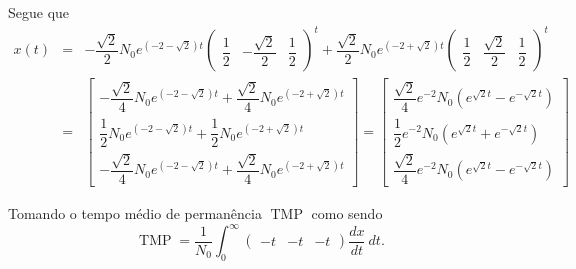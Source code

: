 Segue que
\[\begin{array}{rclcl}
x(t) &=& - \dfrac{\sqrt{2}}{2}N_{0} e^{(-2 - \sqrt{2})t} \left(\begin{array}{ccc} \dfrac{1}{2} & - \dfrac{\sqrt{2}}{2} & \dfrac{1}{2} \end{array}\right)^{t} + \dfrac{\sqrt{2}}{2}N_{0} e^{(-2 + \sqrt{2})t} \left(\begin{array}{ccc} \dfrac{1}{2} & \dfrac{\sqrt{2}}{2} & \dfrac{1}{2} \end{array}\right)^{t} \\[0.5cm]
&=& \left[\begin{array}{c}
- \dfrac{\sqrt{2}}{4}N_{0} e^{(-2 - \sqrt{2})t} + \dfrac{\sqrt{2}}{4}N_{0} e^{(-2 + \sqrt{2})t}  \\[0.5cm]
\dfrac{1}{2}N_{0} e^{(-2 - \sqrt{2})t} + \dfrac{1}{2}N_{0} e^{(-2 + \sqrt{2})t} \\[0.5cm]
- \dfrac{\sqrt{2}}{4}N_{0} e^{(-2 - \sqrt{2})t} + \dfrac{\sqrt{2}}{4}N_{0} e^{(-2 + \sqrt{2})t} 
\end{array}\right]
 = \left[
\begin{array}{c}
\dfrac{\sqrt{2}}{4}e^{-2}N_{0}(e^{\sqrt{2}t} - e^{- \sqrt{2}t}) \\[0.5cm]
\dfrac{1}{2}e^{-2}N_{0}(e^{\sqrt{2}t} + e^{- \sqrt{2}t}) \\[0.5cm]
\dfrac{\sqrt{2}}{4}e^{-2}N_{0}(e^{\sqrt{2}t} - e^{- \sqrt{2}t}) 
\end{array}\right]
\end{array}\]

Tomando o tempo médio de permanência $\operatorname{TMP}$ como sendo
\[\operatorname{TMP} = \dfrac{1}{N_{0}} \displaystyle\int_{0}^{\infty}  \left(\begin{array}{ccc} -t & -t & -t \end{array}\right) \frac{dx}{dt}\ dt.\]



